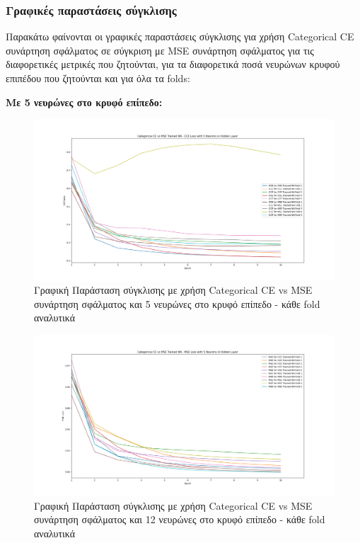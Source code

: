 \documentclass[12pt,a4paper]{article}
\begin{document}
\subsubsection{Γραφικές παραστάσεις σύγκλισης}

Παρακάτω φαίνονται οι γραφικές παραστάσεις σύγκλισης για χρήση Categorical CE συνάρτηση σφάλματος σε σύγκριση με MSE συνάρτηση σφάλματος για τις διαφορετικές μετρικές που ζητούνται, για τα διαφορετικά ποσά νευρώνων κρυφού επιπέδου που ζητούνται και για όλα τα folds:

\textbf{Με 5 νευρώνες στο κρυφό επίπεδο:}

\begin{figure}[H]
	\includegraphics[width=\textwidth]{1. CCE vs MSE - CCE Loss - 5 Neurons.png}
	\caption{Γραφική Παράσταση σύγκλισης με χρήση Categorical CE vs MSE συνάρτηση σφάλματος και 5 νευρώνες στο κρυφό επίπεδο - κάθε fold αναλυτικά}
\end{figure}

\begin{figure}[H]
	\includegraphics[width=\textwidth]{2. CCE vs MSE - MSE Loss - 5 Neurons.png}
	\caption{Γραφική Παράσταση σύγκλισης με χρήση Categorical CE vs MSE συνάρτηση σφάλματος και 12 νευρώνες στο κρυφό επίπεδο - κάθε fold αναλυτικά}
\end{figure}
\end{document}
